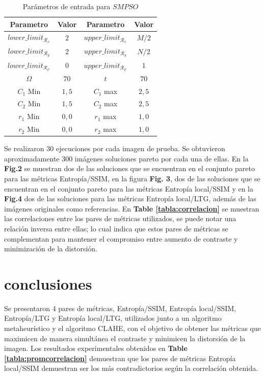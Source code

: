 \documentclass[spanish,twocolumn]{article}
\begin{document}
{\begin{table}[h]
\begin{center}
 \begin{tabular}{||c c | c c||} 
 \hline
 Parametro & Valor & Parametro & Valor \\ [0.5ex] 
 \hline\hline
 $lower\_limit_{\mathscr{R}_x}$ & $2$ & $upper\_limit_{\mathscr{R}_x}$ & $M/2$ \\ 
 \hline
 $lower\_limit_{\mathscr{R}_y}$ & $2$ & $upper\_limit_{\mathscr{R}_y}$ & $N/2$ \\  
 \hline
 $lower\_limit_{\mathscr{R}_{\mathscr{C}}}$ & $0$ & $upper\_limit_{\mathscr{R}_{\mathscr{C}}}$ & $1$ \\
\hline
$\Omega$ & $70$ & $t$ & $70$ \\ 
\hline
$C_1$ Min & $1,5$ & $C_1$ max & $2,5$ \\ 
\hline
$C_2$ Min & $1,5$ & $C_2$ max & $2,5$ \\ 
\hline
$r_1$ Min & $0,0$ & $r_1$ max & $1,0$ \\ 
\hline
$r_2$ Min & $0,0$ & $r_2$ max & $1,0$ \\ [1ex]
\hline
\end{tabular}
\end{center}
\caption[Parámetros de entrada para $SMPSO$]{Parámetros de entrada para $SMPSO$}
\label{table:parametrospso}
\end{table}
 
Se realizaron 30 ejecuciones por cada imagen de prueba. Se obtuvieron aproximadamente 300 imágenes soluciones pareto por cada una de ellas. En la \textbf{Fig.2} se muestran dos de las soluciones que se encuentran en el conjunto pareto para las métricas Entropía/SSIM, en la figura \textbf {Fig. 3}, dos de las soluciones que se encuentran en el conjunto pareto para las métricas Entropía local/SSIM y en la \textbf{Fig.4} dos de las soluciones para las métricas Entropía local/LTG, además de las imágenes originales como referencias. En \textbf{Table \ref{tabla:correlacion}} se muestran las correlaciones entre los pares de métricas utilizados, se puede notar una relación inversa entre ellas; lo cual indica que estos pares de métricas se complementan para mantener el compromiso entre aumento de contraste y minimización de la distorsión. 

\section{conclusiones}
\label{sec:conclusion}
Se presentaron 4 pares de métricas, Entropía/SSIM, Entropía local/SSIM, Entropía/LTG y Entropía local/LTG, utilizados junto a un algoritmo metaheurístico y el algoritmo CLAHE, con el objetivo de obtener las métricas que maximicen de manera simultánea el contraste y minimicen la distorsión de la imagen. Los resultados experimentales obtenidos en \textbf{Table \ref{tabla:promcorrelacion}} demuestran que los pares de métricas Entropía local/SSIM demuestran ser los más contradictorios según la correlación obtenida.

}
\end{document}
